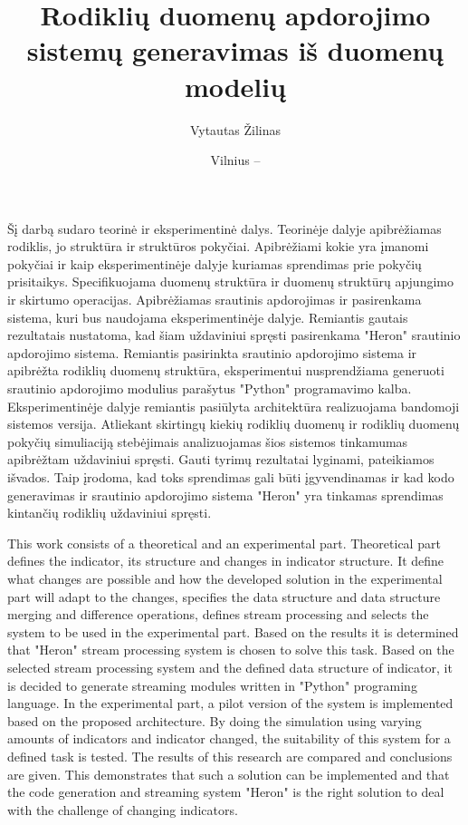 \documentclass{VUMIFPSbakalaurinis}
\title{Rodiklių duomenų apdorojimo sistemų generavimas iš duomenų modelių}
\author{Vytautas Žilinas}
\date{Vilnius – \the\year}
\begin{document}
 
\maketitle

\cleardoublepage{}
\setcounter{page}{2}

Šį darbą sudaro teorinė ir eksperimentinė dalys. Teorinėje dalyje apibrėžiamas rodiklis, jo struktūra ir struktūros pokyčiai. Apibrėžiami kokie yra įmanomi pokyčiai ir kaip eksperimentinėje dalyje kuriamas sprendimas prie pokyčių prisitaikys. Specifikuojama duomenų struktūra ir duomenų struktūrų apjungimo ir skirtumo operacijas. Apibrėžiamas srautinis apdorojimas ir pasirenkama sistema, kuri bus naudojama eksperimentinėje dalyje. Remiantis gautais rezultatais
nustatoma, kad šiam uždaviniui spręsti pasirenkama "Heron" srautinio apdorojimo sistema. Remiantis pasirinkta srautinio apdorojimo sistema ir apibrėžta rodiklių duomenų struktūra, eksperimentui nusprendžiama generuoti srautinio apdorojimo modulius parašytus "Python" programavimo kalba. Eksperimentinėje dalyje remiantis pasiūlyta architektūra realizuojama bandomoji sistemos versija. Atliekant skirtingų kiekių rodiklių duomenų ir rodiklių duomenų pokyčių simuliaciją stebėjimais analizuojamas šios sistemos tinkamumas apibrėžtam uždaviniui spręsti. Gauti tyrimų rezultatai lyginami, pateikiamos išvados. Taip įrodoma, kad toks sprendimas gali būti įgyvendinamas ir kad kodo generavimas ir srautinio apdorojimo sistema "Heron" yra tinkamas sprendimas kintančių rodiklių uždaviniui spręsti.

This work consists of a theoretical and an experimental part. Theoretical part defines the indicator, its structure and changes in indicator structure. It define what changes are possible and how the developed solution in the experimental part will adapt to the changes, specifies the data structure and data structure merging and difference operations, defines stream processing and selects the system to be used in the experimental part. Based on the results it is determined that "Heron" stream processing system is chosen to solve this task. Based on the selected stream processing system and the defined data structure of indicator, it is decided to generate streaming modules written in "Python" programing language. In the experimental part, a pilot version of the system is implemented based on the proposed architecture. By doing the simulation using varying amounts of indicators and indicator changed, the suitability of this system for a defined task is tested. The results of this research are compared and conclusions are given. This demonstrates that such a solution can be implemented and that the code generation and streaming system "Heron" is the right solution to deal with the challenge of changing indicators.
\end{document}
